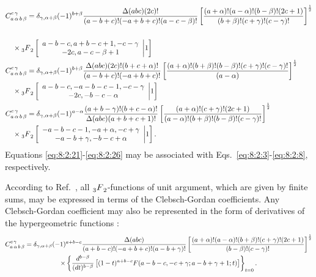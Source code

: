\begin{align}
& \clebsch{a}{\alpha}{b}{\beta}{c}{\gamma}=\delta_{\gamma, \alpha+\beta}(-1)^{b+\beta} \frac{\Delta(a b c)(2 c)!}{(a-b+c)!(-a+b+c)!(a-c-\beta)!}\left[\frac{(a+\alpha)!(a-\alpha)!(b-\beta)!(2 c+1)}{(b+\beta)!(c+\gamma)!(c-\gamma)!}\right]^{\frac{1}{2}}  \notag\\
&  \label{eq:8:2:24}\\
& \quad \times\Fnm[r]{3}{2}{
a-b-c, a+b-c+1,-c-\gamma }{-2 c, a-c-\beta+1}{1} \notag\\
& \clebsch{a}{\alpha}{b}{\beta}{c}{\gamma}=\delta_{\gamma, \alpha+\beta}(-1)^{b+\beta} \frac{\Delta(a b c)(2 c)!(b+c+\alpha)!}{(a-b+c)!(-a+b+c)!}\left[\frac{(a+\alpha)!(b+\beta)!(b-\beta)!(c+\gamma)!(c-\gamma)!}{(a-\alpha)}\right]^{\frac{1}{2}}  \notag\\
& \quad \times\Fnm[r]{3}{2}{
a-b-c,-a-b-c-1,-c-\gamma}{
-2 c,-b-c-\alpha}{1}
\label{eq:8:2:25}\\
& \clebsch{a}{\alpha}{b}{\beta}{c}{\gamma}=\delta_{\gamma, \alpha+\beta}(-1)^{a-\alpha} \frac{(a+b-\gamma)!(b+c-\alpha)!}{\Delta(a b c)(a+b+c+1)!}\left[\frac{(a+\alpha)!(c+\gamma)!(2 c+1)}{(a-\alpha)!(b+\beta)!(b-\beta)!(c-\gamma)!}\right]^{\frac{1}{2}}  \notag\\
& \quad \times\Fnm[r]{3}{2}{-a-b-c-1,-a+\alpha,-c+\gamma}{-a-b+\gamma,-b-c+\alpha}{1}
. \label{eq:8:2:26}
\end{align}
Equations \eqref{eq:8:2:21}-\eqref{eq:8:2:26} may be associated with Eqs.~\eqref{eq:8:2:3}-\eqref{eq:8:2:8}, respectively.

According to Ref.~\cite{ref036}, all $\prescript{}{3}{F}_{2}^{}$-functions of unit argument, which are given by finite sums, may be expressed in terms of the Clebsch-Gordan coefficients. Any Clebsch-Gordan coefficient may also be represented in the form of derivatives of the hypergeometric functions \cite{ref046}:
\begin{gather}
C_{a\,\alpha\,b\,\beta}^{c\,\gamma}=\delta_{\gamma, \alpha+\beta}(-1)^{a+b-c} \frac{\Delta(a b c)}{(a+b-c)!(-a+b+c)!(a-b+\gamma)!}\left[\frac{(a+\alpha)!(a-\alpha)!(b+\beta)!(c+\gamma)!(2 c+1)}{(b-\beta)!(c-\gamma)!}\right]^{\frac{1}{2}}  \notag\\
\times\left\{\frac{d^{b-\beta}}{(d t)^{b-\beta}}\left[(1-t)^{a+b-c} F(a-b-c,-c+\gamma ; a-b+\gamma+1 ; t)\right]\right\}_{t=0}. \label{eq:8:2:27}
\end{gather}
